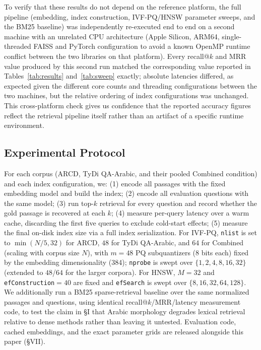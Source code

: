 \documentclass[conference]{IEEEtran}
\begin{document}
To verify that these results do not depend on the reference platform, the full pipeline (embedding, index construction, IVF-PQ/HNSW parameter sweeps, and the BM25 baseline) was independently re-executed end to end on a second machine with an unrelated CPU architecture (Apple Silicon, ARM64, single-threaded FAISS and PyTorch configuration to avoid a known OpenMP runtime conflict between the two libraries on that platform). Every recall@$k$ and MRR value produced by this second run matched the corresponding value reported in Tables~\ref{tab:results} and~\ref{tab:sweep} exactly; absolute latencies differed, as expected given the different core counts and threading configurations between the two machines, but the relative ordering of index configurations was unchanged. This cross-platform check gives us confidence that the reported accuracy figures reflect the retrieval pipeline itself rather than an artifact of a specific runtime environment.

\subsection{Experimental Protocol}

For each corpus (ARCD, TyDi QA-Arabic, and their pooled Combined condition) and each index configuration, we: (1) encode all passages with the fixed embedding model and build the index; (2) encode all evaluation questions with the same model; (3) run top-$k$ retrieval for every question and record whether the gold passage is recovered at each $k$; (4) measure per-query latency over a warm cache, discarding the first five queries to exclude cold-start effects; (5) measure the final on-disk index size via a full index serialization. For IVF-PQ, \texttt{nlist} is set to $\min(N/5, 32)$ for ARCD, $48$ for TyDi QA-Arabic, and $64$ for Combined (scaling with corpus size $N$), with $m=48$ PQ subquantizers ($8$ bits each) fixed by the embedding dimensionality (384); \texttt{nprobe} is swept over $\{1,2,4,8,16,32\}$ (extended to $48$/$64$ for the larger corpora). For HNSW, $M=32$ and \texttt{efConstruction}$=40$ are fixed and \texttt{efSearch} is swept over $\{8,16,32,64,128\}$. We additionally run a BM25 \cite{robertson2009probabilistic} sparse-retrieval baseline over the same normalized passages and questions, using identical recall@$k$/MRR/latency measurement code, to test the claim in \S I that Arabic morphology degrades lexical retrieval relative to dense methods rather than leaving it untested. Evaluation code, cached embeddings, and the exact parameter grids are released alongside this paper (\S VII).
\end{document}
